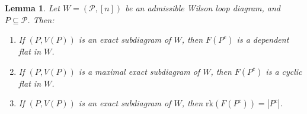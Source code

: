 \documentclass[11pt]{article}
\newcommand{\rk}{\textrm{rk} }
\newcommand{\cP}{\mathcal{P}}
\newcommand{\Prop}{\textrm{Prop}}
\newtheorem{lem}[thm]{Lemma}
\theoremstyle{remark}
\theoremstyle{definition}
\newtheorem{dfn}[thm]{Definition}
\begin{document}





\begin{lem} \label{maxexactcomplementrank}
Let $W = (\cP, [n])$ be an admissible Wilson loop diagram, and $P \subseteq \cP$. Then: \begin{enumerate}
\item If $(P,V(P))$ is an exact subdiagram of $W$, then $F(P^c)$ is a dependent flat in $W$.
\item If $(P,V(P))$ is a maximal exact subdiagram of $W$, then $F(P^c)$ is a cyclic flat in $W$.
\item If $(P,V(P))$ is an exact subdiagram of $W$, then $\rk(F(P^c)) = |P^c|$.
\end{enumerate} 
\end{lem}
\end{document}
